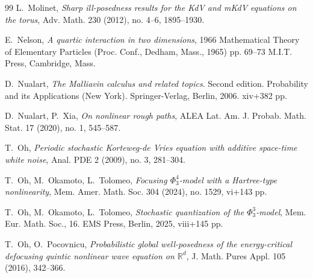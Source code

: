 \documentclass[letterpaper, 11pt,  reqno]{amsart}
\newcommand{\1}{\hspace{0.5mm}\textup{I}\hspace{0.5mm}}
\newcommand{\R}{\mathbb{R}}
\numberwithin{equation}{section}
\numberwithin{theorem}{section}
\begin{document}
\begin{thebibliography}{99}
L.~Molinet,
{\it Sharp ill-posedness results for the KdV and mKdV equations on the torus},
Adv. Math. 230 (2012), no. 4--6, 1895--1930.








E.~Nelson, 
{\it A quartic interaction in two dimensions}, 
 1966 Mathematical Theory of Elementary Particles (Proc. Conf., Dedham, Mass., 1965) pp. 69--73 M.I.T. Press, Cambridge, Mass.





D.~Nualart, 
{\it The Malliavin calculus and related topics}. Second edition. Probability and its Applications (New York). Springer-Verlag, Berlin, 2006. xiv+382 pp.  
 
 
 
 
 
 
D.~Nualart, P.~Xia, 
{\it On nonlinear rough paths},
ALEA Lat. Am. J. Probab. Math. Stat. 17 (2020), no. 1, 545--587. 
 
% 



T.~Oh, 
{\it Periodic stochastic Korteweg-de Vries equation with additive space-time white noise}, 
Anal. PDE 2 (2009), no. 3, 281--304. 





T.~Oh, M.~Okamoto, L.~Tolomeo,
{\it Focusing $\Phi^4_3$-model with a Hartree-type nonlinearity}, 
Mem. Amer. Math. Soc. 304 (2024), no. 1529, vi+143 pp. 



T.~Oh, M.~Okamoto, L.~Tolomeo,
{\it Stochastic quantization of the $\Phi^3_3$-model}, 
Mem. Eur. Math. Soc., 16. EMS Press, Berlin, 2025, viii+145 pp. 



%
%
%


T.~Oh, O.~Pocovnicu,
{\it  Probabilistic global well-posedness of the energy-critical defocusing quintic nonlinear wave equation on $\R^d$}, J. Math. Pures Appl. 105 (2016), 342--366. 






\end{thebibliography}
\end{document}

